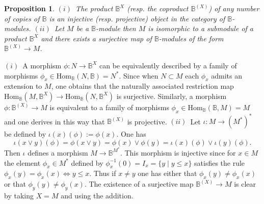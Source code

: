 \documentclass[12pt]{article}
\newtheorem{prop}[thm]{Proposition}
\def\Hom{{\rm Hom}}
\def\B{{\mathbb B}}
\def\Hom {{\mbox{Hom}}}
\begin{document}
\begin{prop}\label{inj3}$(i)$~The product $\B^X$ (resp. the coproduct $\B^{(X)}$) of any number of copies of $\B$ is an injective (resp. projective) object in the category of $\B$-modules.\newline
$(ii)$~Let $M$ be a $\B$-module then $M$ is isomorphic to a submodule of a product $\B^X$ and there exists a surjective map of $\B$-modules of the form $\B^{(X)}\to M$.	
\end{prop}
\proof $(i)$~A morphism $\phi:N\to \B^X$ can be equivalently described by a family of morphisms $\phi_x\in \Hom_\B(N,\B)=N^*$. Since when $N\subset M$ each $\phi_x$ admits an extension to $M$, one obtains that the naturally associated restriction map $\Hom_\B(M,\B^X)\to\Hom_\B(N,\B^X)$ is surjective. Similarly, a morphism $\phi:\B^{(X)}\to M$ is equivalent to a family of morphisms $\phi_x\in \Hom_\B(\B,M)=M$ and one derives in this way that $\B^{(X)}$ is projective.\newline
$(ii)$~Let $\iota: M\to (M^*)^*$ be defined by $\iota(x)(\phi):=\phi(x)$. One has
$$
\iota(x\vee y)(\phi)=\phi(x\vee y)= \phi(x)\vee \phi(y)=\iota(x)(\phi)\vee \iota(y)(\phi).
$$
Then $\iota$ defines a morphism $M\to\B^{M^*}$. This morphism is injective since for $x\in M$ the element $\phi_x\in M^*$ defined by $\phi_x^{-1}(0)=I_x=\{y\mid y\leq x\}$ satisfies the rule $\phi_x(y)=\phi_x(x)\iff y\leq x$. Thus if $x\neq y$ one has either that $\phi_x(y)\neq\phi_x(x)$ or that $\phi_y(y)\neq\phi_y(x)$. The existence of a surjective map $\B^{(X)}\to M$ is clear by taking $X=M$ and using the addition. \endproof 
\end{document}
